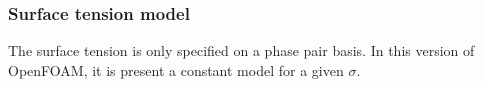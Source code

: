 \subsubsection{Surface tension model}

\setlength{\parindent}{0.5cm} The surface tension is only specified on a phase pair basis. In this version of OpenFOAM, it is present a constant model for a given $\sigma$.




